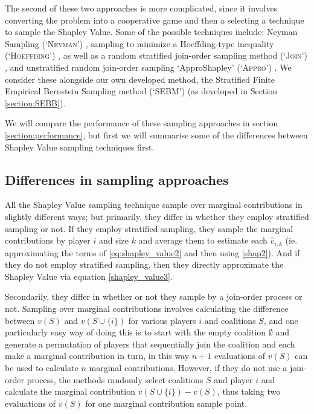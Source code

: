 The second of these two approaches is more complicated, since it involves converting the problem into a cooperative game and then a selecting a technique to sample the Shapley Value.
Some of the possible techniques include: Neyman Sampling (`\textsc{Neyman}') \cite{CASTRO2017180,1938.10503378}, sampling to minimize a Hoeffding-type inequality (`\textsc{Hoeffding}') \cite{2013arXiv1306.4265M}, as well as a random stratified join-order sampling method (`\textsc{Join}') \cite{CASTRO2017180}, and unstratified random join-order sampling `ApproShapley' (`\textsc{Appro}') \cite{DBLP:journals/cor/CastroGT09}.
We consider these alongside our own developed method, the Stratified Finite Empirical Bernstein Sampling method (`SEBM') (as developed in Section \ref{section:SEBB}).

We will compare the performance of these sampling approaches in section \ref{section:performance}, but first we will summarise some of the differences between Shapley Value sampling techniques first.

\subsection{Differences in sampling approaches}

All the Shapley Value sampling technique sample over marginal contributions in slightly different ways; but primarily, they differ in whether they employ stratified sampling or not.
If they employ stratified sampling, they sample the marginal contributions by player $i$ and size $k$ and average them to estimate each $\hat{v}_{i,k}$ (ie. approximating the terms of \eqref{eq:shapley_value2} and then using \eqref{shap2}).
And if they do not employ stratified sampling, then they directly approximate the Shapley Value via equation \eqref{shapley_value3}.

Secondarily, they differ in whether or not they sample by a join-order process or not. Sampling over marginal contributions involves calculating the difference between $v(S)$ and $v(S\cup\{i\})$ for various players $i$ and coalitions $S$, and one particularly easy way of doing this is to start with the empty coalition $\emptyset$ and generate a permutation of players that sequentially join the coalition and each make a marginal contribution in turn, in this way $n+1$ evaluations of $v(S)$ can be used to calculate $n$ marginal contributions.
However, if they do not use a join-order process, the methods randomly select coalitions $S$ and player $i$ and calculate the marginal contribution $v(S\cup\{i\}) - v(S)$, thus taking two evaluations of $v(S)$ for one marginal contribution sample point.

